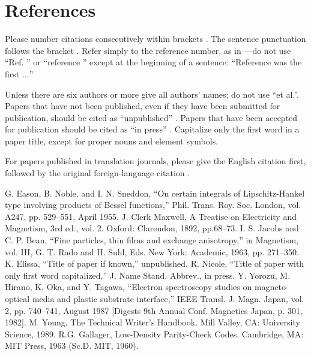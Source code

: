 \documentclass[conference]{IEEEtran}
\begin{document}
\section*{References}

Please number citations consecutively within brackets \cite{b1}. The 
sentence punctuation follows the bracket \cite{b2}. Refer simply to the reference 
number, as in \cite{b3}---do not use ``Ref. \cite{b3}'' or ``reference \cite{b3}'' except at 
the beginning of a sentence: ``Reference \cite{b3} was the first $\ldots$''

Unless there are six authors or more give all authors' names; do not use 
``et al.''. Papers that have not been published, even if they have been 
submitted for publication, should be cited as ``unpublished'' \cite{b4}. Papers 
that have been accepted for publication should be cited as ``in press'' \cite{b5}. 
Capitalize only the first word in a paper title, except for proper nouns and 
element symbols.

For papers published in translation journals, please give the English 
citation first, followed by the original foreign-language citation \cite{b6}.

\begin{thebibliography}{00}
 G. Eason, B. Noble, and I. N. Sneddon, ``On certain integrals of Lipschitz-Hankel type involving products of Bessel functions,'' Phil. Trans. Roy. Soc. London, vol. A247, pp. 529--551, April 1955.
 J. Clerk Maxwell, A Treatise on Electricity and Magnetism, 3rd ed., vol. 2. Oxford: Clarendon, 1892, pp.68--73.
 I. S. Jacobs and C. P. Bean, ``Fine particles, thin films and exchange anisotropy,'' in Magnetism, vol. III, G. T. Rado and H. Suhl, Eds. New York: Academic, 1963, pp. 271--350.
 K. Elissa, ``Title of paper if known,'' unpublished.
 R. Nicole, ``Title of paper with only first word capitalized,'' J. Name Stand. Abbrev., in press.
 Y. Yorozu, M. Hirano, K. Oka, and Y. Tagawa, ``Electron spectroscopy studies on magneto-optical media and plastic substrate interface,'' IEEE Transl. J. Magn. Japan, vol. 2, pp. 740--741, August 1987 [Digests 9th Annual Conf. Magnetics Japan, p. 301, 1982].
 M. Young, The Technical Writer's Handbook. Mill Valley, CA: University Science, 1989.
 R.G. Gallager, Low-Density Parity-Check Codes. Cambridge, MA: MIT Press, 1963 (Sc.D. MIT, 1960).
\end{thebibliography}
\end{document}
